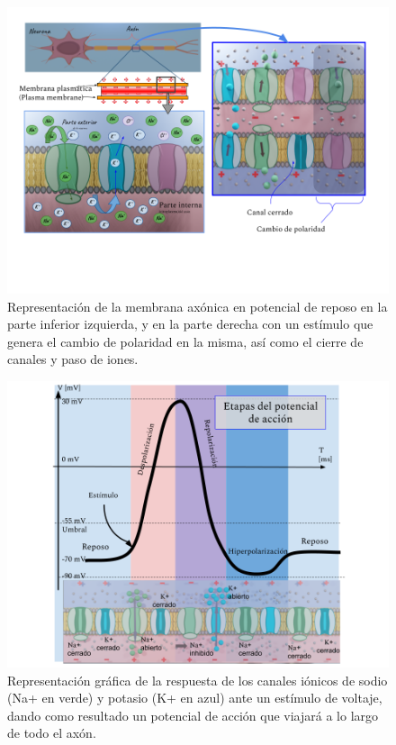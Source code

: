 \begin{figure}[h]
 \centering
 \includegraphics[scale=0.5]{../Figuras/MembranaP.png}
 \caption{Representación de la membrana axónica en potencial de reposo en la parte inferior izquierda, y en la parte derecha con un estímulo que genera el cambio de polaridad en la misma, así como el cierre de canales y paso de iones.}
 \label{fig:MembranaP}
\end{figure}

\begin{figure}[h]
 \centering
 \includegraphics[scale=0.5]{../Figuras/Grafica.png}
 \caption{Representación gráfica de la respuesta de los canales iónicos de sodio (Na+ en verde) y potasio (K+ en azul) ante un estímulo de voltaje, dando como resultado un potencial de acción que viajará a lo largo de todo el axón.}
 \label{fig:graficaP}
\end{figure}

